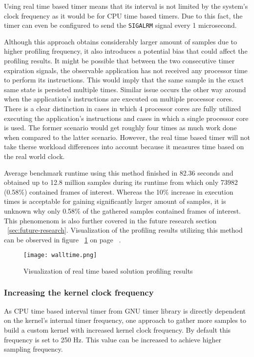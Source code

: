 \documentclass[..thesis.tex]{subfiles}
\begin{document}
Using real time based timer means that its interval is not limited by the system's clock frequency as it would be for CPU time based timers. Due to this fact, the timer can even be configured to send the \texttt{SIGALRM} signal every 1 microsecond.

Although this approach obtains considerably larger amount of samples due to higher profiling frequency, it also introduces a potential bias that could affect the profiling results. It might be possible that between the two consecutive timer expiration signals, the observable application has not received any processor time to perform its instructions. This would imply that the same sample in the exact same state is persisted multiple times. Similar issue occurs the other way around when the application's instructions are executed on multiple processor cores. There is a clear distinction in cases in which 4 processor cores are fully utilized executing the application's instructions and cases in which a single processor core is used. The former scenario would get roughly four times as much work done when compared to the latter scenario. However, the real time based timer will not take therse workload differences into account because it measures time based on the real world clock.

Average benchmark runtime using this method finished in 82.36 seconds and obtained up to 12.8 million samples during its runtime from which only 73982 (0.58\%) contained frames of interest. Whereas the 10\% increase in execution times is acceptable for gaining significantly larger amount of samples, it is unknown why only 0.58\% of the gathered samples contained frames of interest. This phenomenom is also further covered in the future research section ~\ref{sec:future-research}. Visualization of the profiling results utilizing this method can be observed in figure ~\ref{fig:walltime} on page ~\pageref{fig:walltime}.
\begin{figure}[H]
\texttt{[image: walltime.png]}
\caption{Visualization of real time based solution profiling results}
\label{fig:walltime}
\end{figure}

\subsubsection{Increasing the kernel clock frequency}
\label{kernel-clock}
As CPU time based interval timer from GNU timer library is directly dependent on the kernel's internal timer frequency, one approach to gather more samples to build a custom kernel with increased kernel clock frequency. By default this frequency is set to 250 Hz.\cite{torvalds_linux:_2018} This value can be increased to achieve higher sampling frequency. 
\end{document}
